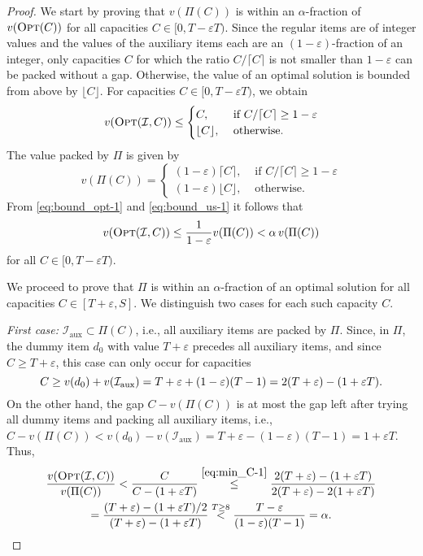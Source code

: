\documentclass[11pt]{article}
\newcommand{\opt}{\textsc{Opt}}
\newcommand{\OPT}{\opt}
\newcommand{\I}{\mathcal{I}}
\renewcommand{\epsilon}{\varepsilon}
\begin{document}
\begin{proof}
We start by proving that $v(\Pi(C))$ is within an $\alpha$-fraction
of $v(\OPT(C))$ for all capacities $C\in[0,T-\epsilon T)$. Since
the regular items are of integer values and the values of the auxiliary
items each are an $(1-\epsilon)$-fraction of an integer, only capacities
$C$ for which the ratio $C/\lceil C\rceil$ is not smaller than $1-\epsilon$
can be packed without a gap. Otherwise, the value of an optimal solution
is bounded from above by $\lfloor C\rfloor$. For capacities $C\in[0,T-\epsilon T)$,
we obtain
\begin{equation}
v(\OPT(\I,C))\leq\begin{cases}
C, & \text{ if }C/\lceil C\rceil\geq1-\epsilon\\
\lfloor C\rfloor, & \text{ otherwise.}
\end{cases}\label{eq:bound_opt-1}
\end{equation}
The value packed by $\Pi$ is given by
\begin{equation}
v(\Pi(C))=\begin{cases}
(1-\epsilon)\lceil C\rceil, & \text{ if }C/\lceil C\rceil\geq1-\epsilon\\
(1-\epsilon)\lfloor C\rfloor, & \text{ otherwise.}
\end{cases}\label{eq:bound_us-1}
\end{equation}
From \eqref{eq:bound_opt-1} and \eqref{eq:bound_us-1} it follows
that 
\begin{align}
v(\OPT(\I,C))\leq\frac{1}{1-\epsilon}v(\Pi(C))<\alpha\, v(\Pi(C))\label{eq:bound_first_case-1}
\end{align}
for all $C\in[0,T-\epsilon T)$.

We proceed to prove that $\Pi$ is within an $\alpha$-fraction of an optimal
solution for all capacities $C\in[T+\epsilon,S]$. We distinguish
two cases for each such capacity $C$.

\emph{First case:} $\I_{\text{{aux}}}\subset\Pi(C)$, i.e., all auxiliary
items are packed by $\Pi$. Since, in $\Pi$, the dummy item $d_{0}$
with value $T+\epsilon$ precedes all auxiliary items, and since $C\geq T+\epsilon$,
this case can only occur for capacities
\begin{equation}
C\geq v(d_{0})+v(\I_{\text{\text{{aux}}}})=T+\varepsilon+(1-\varepsilon)(T-1)=2(T+\varepsilon)-(1+\varepsilon
T).\label{eq:min_C-1}
\end{equation}
On the other hand, the gap $C-v(\Pi(C))$ is at most the gap left
after trying all dummy items and packing all auxiliary items, i.e.,
$C-v(\Pi(C))<v(d_{0})-v(\I_{\text{{aux}}})=T+\epsilon-(1-\epsilon)(T-1)=1+\epsilon T$.
Thus,
\begin{multline*}
\frac{v(\OPT(\I,C))}{v(\Pi(C))}<\frac{C}{C-(1+\epsilon
T)}\overset{\eqref{eq:min_C-1}}{\leq}\frac{2(T+\varepsilon)-(1+\varepsilon T)}{2(T+\varepsilon)-2(1+\varepsilon T)}\\
=\frac{(T+\epsilon)-(1+\epsilon T)/2}{(T+\varepsilon)-(1+\varepsilon
T)}\overset{T\geq8}{<}\frac{T-\epsilon}{(1-\epsilon)(T-1)}=\alpha.
\end{multline*}



\end{proof}
\end{document}
